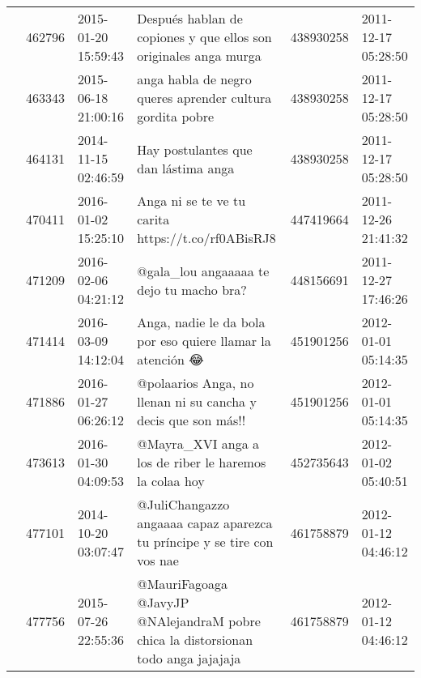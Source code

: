 \begin{tabular}{llllrl}
           & 462796  & 2015-01-20 15:59:43 &                                                                             Después hablan de copiones y que ellos son originales anga murga &   438930258 & 2011-12-17 05:28:50 \\
           & 463343  & 2015-06-18 21:00:16 &                                                                                    anga habla de negro queres aprender cultura gordita pobre &   438930258 & 2011-12-17 05:28:50 \\
           & 464131  & 2014-11-15 02:46:59 &                                                                                                         Hay postulantes que dan lástima anga &   438930258 & 2011-12-17 05:28:50 \\
           & 470411  & 2016-01-02 15:25:10 &                                                                                        Anga ni se te ve tu carita 🐶🐶 https://t.co/rf0ABisRJ8 &   447419664 & 2011-12-26 21:41:32 \\
           & 471209  & 2016-02-06 04:21:12 &                                                                                                     @gala\_lou angaaaaa te dejo tu macho bra? &   448156691 & 2011-12-27 17:46:26 \\
           & 471414  & 2016-03-09 14:12:04 &                                                                                   Anga, nadie le da bola por eso quiere llamar la atención 😂 &   451901256 & 2012-01-01 05:14:35 \\
           & 471886  & 2016-01-27 06:26:12 &                                                                                @polaarios Anga, no llenan ni su cancha y decis que son más!! &   451901256 & 2012-01-01 05:14:35 \\
           & 473613  & 2016-01-30 04:09:53 &                                                                                       @Mayra\_XVI anga a los de riber le haremos la colaa hoy &   452735643 & 2012-01-02 05:40:51 \\
           & 477101  & 2014-10-20 03:07:47 &                                                                      @JuliChangazzo angaaaa capaz aparezca tu príncipe y se tire con vos nae &   461758879 & 2012-01-12 04:46:12 \\
           & 477756  & 2015-07-26 22:55:36 &                                                            @MauriFagoaga @JavyJP @NAlejandraM pobre chica la distorsionan todo anga jajajaja &   461758879 & 2012-01-12 04:46:12 \\

\end{tabular}
